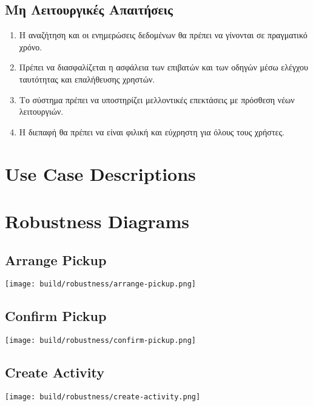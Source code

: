 \documentclass[11pt]{article}
\begin{document}
\subsection{Μη Λειτουργικές Απαιτήσεις}

\begin{enumerate}
    \item Η αναζήτηση και οι ενημερώσεις δεδομένων θα πρέπει να γίνονται σε πραγματικό χρόνο.
    \item Πρέπει να διασφαλίζεται η ασφάλεια των επιβατών και των οδηγών μέσω ελέγχου ταυτότητας
          και επαλήθευσης χρηστών.
    \item Το σύστημα πρέπει να υποστηρίζει μελλοντικές επεκτάσεις με πρόσθεση νέων λειτουργιών.
    \item Η διεπαφή θα πρέπει να είναι φιλική και εύχρηστη για όλους τους χρήστες.
\end{enumerate}

\newpage

% 
\section{Use Case Descriptions}














\section{Robustness Diagrams}
\subsection{Arrange Pickup}
\texttt{[image: build/robustness/arrange-pickup.png]}
\subsection{Confirm Pickup}
\texttt{[image: build/robustness/confirm-pickup.png]}
\subsection{Create Activity}
\texttt{[image: build/robustness/create-activity.png]}
\end{document}
